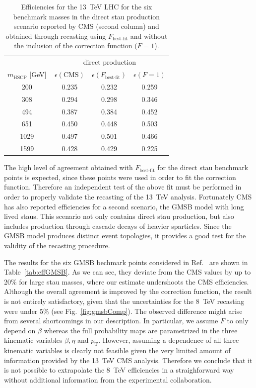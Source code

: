 \begin{table}[t]
\footnotesize
 \begin{center}
\begin{tabular}{c|ccc}
 & \multicolumn{3}{c}{direct production } \\
$m_\text{HSCP}$ [{\rm GeV}] & \,$\epsilon(\text{CMS})$ & $\epsilon(F_\text{best-fit})$& $\epsilon(F=1)$ \\
\hline
200   & \,0.235 & 0.232 & 0.259  \\
308   & \,0.294 & 0.298  & 0.346  \\
494    & \,0.387 & 0.384  & 0.452  \\
651  & \,0.450  & 0.448   & 0.503 \\
1029 & \,0.497 & 0.501  & 0.466 \\
1599 & \,0.428 & 0.429  & 0.225  \\
\hline
\end{tabular}
\end{center}
\caption{Efficiencies for the 13~TeV LHC for the six benchmark masses in the direct stau production scenario
reported by CMS (second column) and obtained through recasting using
$F_\text{best-fit}$ and without the inclusion of the correction function ($F=1$).}
\label{tab:eff}
\end{table}

The high level of agreement obtained with $F_\text{best-fit}$
for the direct stau benchmark points is expected, since these points
were used in order to fit the correction function.
Therefore an independent test of the above fit
must be performed in order to properly validate the recasting of
the 13~TeV analysis.
Fortunately CMS has also reported efficiencies for a second scenario,
the GMSB model with long lived staus. This scenario not
only contains direct stau production, but also includes production
through cascade decays of heavier sparticles.
Since the GMSB model produces distinct event topologies, it
provides a good test for the validity of the recasting
procedure.

The results for the six GMSB bechmark points considered in
Ref.~\cite{CMS-PAS-EXO-16-036} are shown in Table~\ref{tab:effGMSB}. As we can
see, they deviate from the CMS values by up to 20\% for large
stau masses, where our estimate undershoots the CMS efficiencies.
Although the overall agreement is improved by the correction function,
the result is not entirely satisfactory, given that
the uncertainties for the 8~TeV recasting were
under 5\% (see Fig.~\ref{fig:gmsbComp}).
The observed difference might arise from several shortcomings in our description.
In particular, we assume $F$ to only depend on $\beta$ whereas the full
probability maps are parametrized in the three kinematic variables $\beta, \eta$ and $p_\text{T}$.
However, assuming a dependence of all three kinematic variables is clearly
not feasible given the very limited amount of information provided by the
13~TeV CMS analysis.
Therefore we conclude that it is not possible
to extrapolate the 8~TeV efficiencies in a straighforward way without
additional information from the experimental collaboration.

